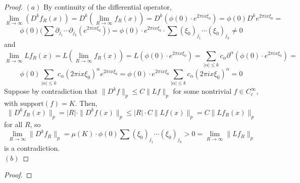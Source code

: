 \documentclass[12pt]{article}
\newenvironment{exercise}[2][Exercise]{\begin{trivlist}
\item[\hskip \labelsep {\bfseries #1}\hskip \labelsep {\bfseries #2.}]}{\end{trivlist}}
\begin{document}
\begin{proof}
  $(a)$ By continuity of the differential operator,
  $$
    \lim_{R \rightarrow \infty} (D^k f_R(x)) =
    D^k(\lim_{R \rightarrow \infty} f_R(x)) =
    D^k(\phi(0) \cdot e^{2 \pi i x \xi_0}) =
    \phi(0)  D^k e^{2 \pi i x \xi_0} =
  $$
  $$
    \phi(0) \Big( \sum \partial_{j_1} \cdots \partial_{j_k}(e^{2 \pi i x \xi_0}) \Big) =
    \phi(0) \cdot e^{2 \pi i x \xi_0}  \cdot \sum (\xi_0)_{j_1} \cdots (\xi_0)_{j_k} \ne 0
  $$
  and
  $$
    \lim_{R \rightarrow \infty} L f_R(x) =
    L(\lim_{R \rightarrow \infty} f_R(x)) =
    L(\phi(0) \cdot e^{2 \pi i x \xi_0}) =
    \sum_{|\alpha| \le k}  c_\alpha \partial^\alpha (\phi(0) \cdot e^{2 \pi i x \xi_0}) =
  $$
  $$
    \phi(0) \sum_{|\alpha| \le k}  c_\alpha (2 \pi i x \xi_0)^\alpha e^{2 \pi i x \xi_0}  =
    \phi(0) \cdot e^{2 \pi i x \xi_0} \sum_{|\alpha| \le k}  c_\alpha (2 \pi i x \xi_0)^\alpha =
    0
  $$
  Suppose by contradiction that $\|D^k f\|_p \le C  \|Lf\|_p$ for some nontrivial $f \in C^\infty_c$, with $\text{support}(f) = K$. Then,
  $$
    \|D^k f_R(x)\|_p =
    |R| \cdot \|D^k f(x)\|_p \le
    |R| \cdot C \|Lf(x)\|_p =
    C \|Lf_R(x)\|_p
  $$
  for all $R$, so
  $$
    \lim_{R \rightarrow \infty} \|D^k f_R\|_p =
    \mu(K) \cdot \phi(0) \sum (\xi_0)_{j_1} \cdots (\xi_0)_{j_k} >
    0 =
    \lim_{R \rightarrow \infty} \|Lf_R\|_p
  $$
  is a contradiction.\\

  $(b)$
\end{proof}

\begin{exercise}{3}
\end{exercise}

\begin{proof}

\end{proof}
\end{document}
